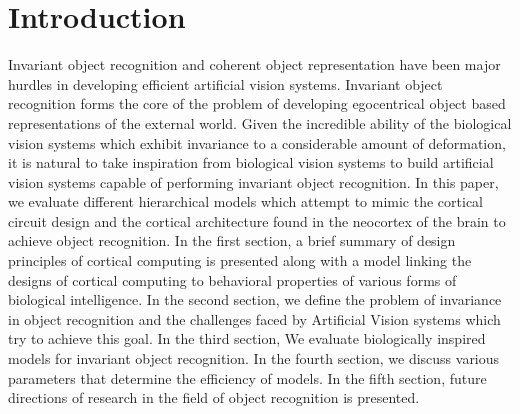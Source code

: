 \documentclass[12pt,twoside]{article}
\theoremstyle{plain}
\theoremstyle{definition}
\theoremstyle{remark}
\begin{document}

\section{Introduction}
\label{sec:introduction}
Invariant object recognition and coherent object representation have been major hurdles in developing efficient artificial vision systems. Invariant object recognition forms the core of the problem of developing egocentrical object based representations of the external world. Given the incredible ability of the biological vision systems which exhibit invariance to a considerable amount of deformation, it is natural to take inspiration from biological vision systems to build artificial vision systems capable of performing invariant object recognition. In this paper, we evaluate different hierarchical models which attempt to mimic the cortical circuit design and the cortical architecture found in the neocortex of the brain to achieve object recognition. In the first section, a brief summary of design principles of cortical computing is presented along with a model \cite{Grossberg2007} linking the designs of cortical computing to behavioral properties of various forms of biological intelligence. In the second section, we define the problem of invariance in object recognition\cite{rohtua} and the challenges faced by Artificial Vision systems which try to achieve this goal. In the third section, We evaluate biologically inspired models for invariant object recognition\cite{Fukushim1980}\cite{JimMutch2008}\cite{NicolasPinto2009}\cite{MarkusLessmann2014}\cite{ThomasSerre2007}\cite{XiaolinHu2014}. In the fourth section, we discuss various parameters that determine the efficiency of models\cite{BrunoAOlshausen2004}\cite{BrunoA.Olshausen1996}\cite{Carandini97linearityand}\cite{EdmundT.Rolls2000}\cite{JamesJ.DiCarlo2007}\cite{NicolasPinto2008}. In the fifth section, future directions of research in the field of object recognition is presented. 
\end{document}
